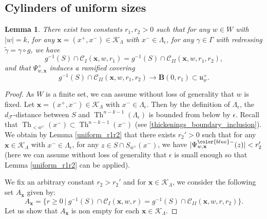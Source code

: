 \documentclass[12pt]{amsbook}%
\newtheorem{lem}[thm]{Lemma}
\theoremstyle{definition}
\theoremstyle{remark}
\numberwithin{section}{chapter}
\numberwithin{subsection}{section}
\numberwithin{figure}{chapter}
\DeclareMathOperator{\Th}{Th}
\newcommand\bac[1]{{\color{blue} #1} }
\def\eps{\epsilon}
\def\dF{d_{\mathcal{F}}}
\def\sK{{\mathscr{K}}}
\def\fuwp{{\mathfrak{u}_w^+}}
\def\Swxd{{S_{w^\vee}(x^-)}}
\def\xpair{{(x^+,x^-)}}
\def\tga{{\tilde{\gamma}}}
\def\Cyli{{\mathcal{C}_I}}
\def\Cylii{{\mathcal{C}_{II}}}
\def\bx{\mathbf{x}}
\begin{document}
{{\subsection{Cylinders of uniform sizes}


\begin{lem}\label{cylindertwoconstants1}
There exist two constants $r_1,r_2>0$ such that for any $w\in W$ with $\vert w\vert=k$, for any $\bx=\xpair \in \sK_\Lambda$ with $x^-\in \Lambda_\epsilon$, for any $\gamma\in \Gamma$ with redressing $\tga=\gamma\circ g$, we have
$$
g^{-1}(S)\cap \Cyli(\bx,w,r_1)=g^{-1}(S)\cap \Cylii(\bx,w,r_1,r_2),
$$
and that $\Psi_{w,\bx}^+$ induces a ramified covering 
$$
g^{-1}(S)\cap \Cylii(\bx,w,r_1,r_2)\rightarrow \mathbf{B}(0,r_1)\subset \fuwp.
$$
\end{lem} 
\begin{proof}
As $W$ is a finite set, we can assume without loss of generality that $w$ is fixed. 
Let $\bx=\xpair \in \sK_\Lambda$ with $x^-\in \Lambda_\epsilon$. Then by the definition of $\Lambda_\eps$, the $\dF$-distance between $S$ and $\Th^{n-k-1}(\Lambda_\epsilon)$ is bounded from 
below by $\epsilon$. Recall that $\Th_{<w^\vee}(x^-)\subset \Th^{n-k-1}(x^-)$ (see \eqref{thickenings_boundary_inclusion}). We obtain by Lemma \ref{uniform_r1r2} that there exists $r_2'>0$ such that for any $\bx \in \sK_\Lambda$ with $x^-\in \Lambda_\epsilon$, for any $z\in S\cap \Swxd$, we have $\vert \Psi_{w,\bx}^{\bac{-}}(z)\vert<r_2'$ (here we can assume without loss of generality that $\eps$ is small enough so that Lemma \ref{uniform_r1r2} can be applied).

We fix an arbitrary constant $r_2>r_2'$ and for $\bx \in \mathcal{K}_{\Lambda}$, we consider the following set $A_{\bx}$ given by: 
\begin{equation*} 
A_{\bx} = \{r \geqslant 0 \ | \ g^{-1}(S)\cap \mathcal{C}_I(\bx, w , r) = g^{-1}(S) \cap \mathcal{C}_{II}(\bx,w, r, r_2) \}. 
\end{equation*}
Let us show that $A_\bx$ is non empty for each $\bx \in \mathcal{K}_{\Lambda}$. 


\end{proof}}}
\end{document}
